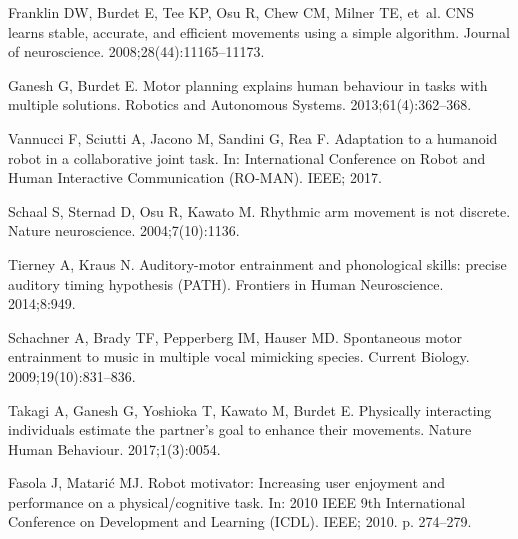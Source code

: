 \begin{thebibliography}{10}
	Franklin DW, Burdet E, Tee KP, Osu R, Chew CM, Milner TE, et~al.
	\newblock CNS learns stable, accurate, and efficient movements using a simple
	algorithm.
	\newblock Journal of neuroscience. 2008;28(44):11165--11173.
	
	Ganesh G, Burdet E.
	\newblock Motor planning explains human behaviour in tasks with multiple
	solutions.
	\newblock Robotics and Autonomous Systems. 2013;61(4):362--368.
	
	Vannucci F, Sciutti A, Jacono M, Sandini G, Rea F.
	\newblock Adaptation to a humanoid robot in a collaborative joint task.
	\newblock In: International Conference on Robot and Human Interactive
	Communication (RO-MAN). IEEE; 2017.
	
	Schaal S, Sternad D, Osu R, Kawato M.
	\newblock Rhythmic arm movement is not discrete.
	\newblock Nature neuroscience. 2004;7(10):1136.
	
	Tierney A, Kraus N.
	\newblock Auditory-motor entrainment and phonological skills: precise auditory
	timing hypothesis (PATH).
	\newblock Frontiers in Human Neuroscience. 2014;8:949.
	
	Schachner A, Brady TF, Pepperberg IM, Hauser MD.
	\newblock Spontaneous motor entrainment to music in multiple vocal mimicking
	species.
	\newblock Current Biology. 2009;19(10):831--836.
	
	Takagi A, Ganesh G, Yoshioka T, Kawato M, Burdet E.
	\newblock Physically interacting individuals estimate the partner's goal to
	enhance their movements.
	\newblock Nature Human Behaviour. 2017;1(3):0054.
	
	Fasola J, Matari{\'c} MJ.
	\newblock Robot motivator: Increasing user enjoyment and performance on a
	physical/cognitive task.
	\newblock In: 2010 IEEE 9th International Conference on Development and
	Learning (ICDL). IEEE; 2010. p. 274--279.
	
\end{thebibliography}
